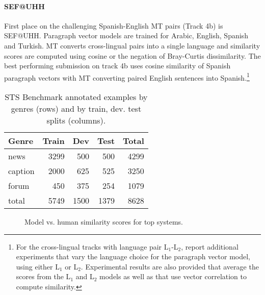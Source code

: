 \documentclass[11pt,a4paper]{article}
\begin{document}
\paragraph{SEF@UHH \textnormal{\cite{duma-menzel:2017:SemEval}}} First place on the challenging Spanish-English MT pairs (Track 4b) is SEF@UHH. Paragraph vector models \cite{quocle2014} are trained for Arabic, English, Spanish and Turkish. MT converts cross-lingual pairs into a single language and similarity scores are computed using cosine or the negation of Bray-Curtis dissimilarity. The best performing submission on track 4b uses cosine similarity of Spanish paragraph vectors with MT converting paired English sentences into Spanish.\footnote{For the cross-lingual tracks with language pair L$_1$-L$_2$,  report additional experiments that vary the language choice for the paragraph vector model, using either L$_1$ or L$_2$. Experimental results are also provided that average the scores from the L$_1$ and L$_2$ models as well as that use vector correlation to compute similarity.}


\begin{table}[t]
\small
\begin{center}
\begin{tabular}{|l|r|r|r|r|} 
\hline
     Genre & Train  & Dev &  Test &Total\\
\hline
  news     &3299  &500  &500  &4299\\
  caption  &2000  &625  &525  &3250\\
  forum &    450  &375  &254  &1079\\
\hline
  total    &5749 &1500 &1379  &8628\\
\hline
\end{tabular}
\end{center}
\caption{STS Benchmark annotated examples by genres (rows) and by train, dev. test splits (columns).
}
\label{tab:stsbenchmark}
\end{table}


\begin{figure*}[h]
\small
     \hfill
     \hfill
     
\caption{Model vs. human similarity scores for top systems.}
\label{fig:modelvshuman}
\end{figure*}
\end{document}
